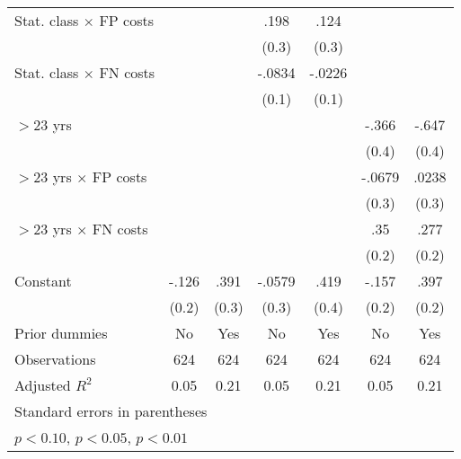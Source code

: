 \begin{table}[htbp]
\begin{tabular}{l*{6}{c}}
Stat. class $\times$ FP costs&                  &                  &     .198         &     .124         &                  &                  \\
                &                  &                  &    (0.3)         &    (0.3)         &                  &                  \\
Stat. class $\times$ FN costs&                  &                  &   -.0834         &   -.0226         &                  &                  \\
                &                  &                  &    (0.1)         &    (0.1)         &                  &                  \\
$>$23 yrs       &                  &                  &                  &                  &    -.366         &    -.647\sym{*}  \\
                &                  &                  &                  &                  &    (0.4)         &    (0.4)         \\
$>$23 yrs $\times$ FP costs&                  &                  &                  &                  &   -.0679         &    .0238         \\
                &                  &                  &                  &                  &    (0.3)         &    (0.3)         \\
$>$23 yrs $\times$ FN costs&                  &                  &                  &                  &      .35         &     .277         \\
                &                  &                  &                  &                  &    (0.2)         &    (0.2)         \\
Constant        &    -.126         &     .391         &   -.0579         &     .419         &    -.157         &     .397\sym{*}  \\
                &    (0.2)         &    (0.3)         &    (0.3)         &    (0.4)         &    (0.2)         &    (0.2)         \\
Prior dummies   &       No         &      Yes         &       No         &      Yes         &       No         &      Yes         \\
\hline
Observations    &      624         &      624         &      624         &      624         &      624         &      624         \\
Adjusted \(R^{2}\)&     0.05         &     0.21         &     0.05         &     0.21         &     0.05         &     0.21         \\
\hline\hline
\multicolumn{7}{l}{\footnotesize Standard errors in parentheses}\\
\multicolumn{7}{l}{\footnotesize \sym{*} \(p<0.10\), \sym{**} \(p<0.05\), \sym{***} \(p<0.01\)}\\
\end{tabular}
\end{table}
